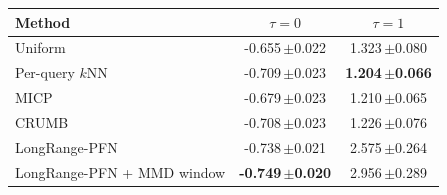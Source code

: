 \begin{tabular}{lcc}
\toprule
Method & $\tau=0$ & $\tau=1$\\
\midrule
Uniform & -0.655\,{\scriptsize$\pm$0.022} & 1.323\,{\scriptsize$\pm$0.080}\\
Per-query $k$NN & -0.709\,{\scriptsize$\pm$0.023} & \textbf{1.204\,{\scriptsize$\pm$0.066}}\\
MICP & -0.679\,{\scriptsize$\pm$0.023} & 1.210\,{\scriptsize$\pm$0.065}\\
CRUMB & -0.708\,{\scriptsize$\pm$0.023} & 1.226\,{\scriptsize$\pm$0.076}\\
LongRange-PFN & -0.738\,{\scriptsize$\pm$0.021} & 2.575\,{\scriptsize$\pm$0.264}\\
LongRange-PFN + MMD window & \textbf{-0.749\,{\scriptsize$\pm$0.020}} & 2.956\,{\scriptsize$\pm$0.289}\\
\bottomrule
\end{tabular}

